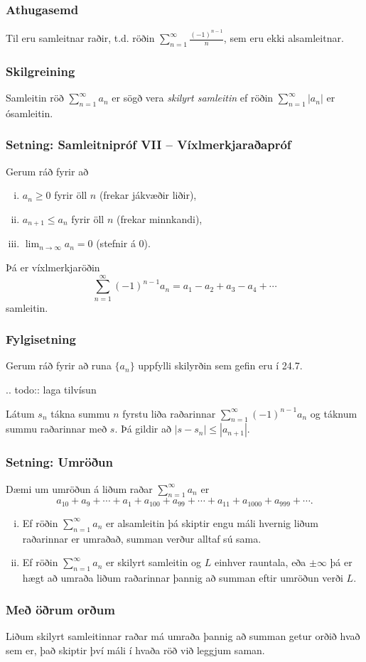 \documentclass[icelandic,a4paper,12pt]{article}
\begin{document}
\subsubsection{Athugasemd}
Til eru samleitnar raðir, t.d. röðin  $\sum_{n=1}^\infty \frac{(-1)^{n-1}}{n}$, sem eru ekki
alsamleitnar. 

\subsubsection{Skilgreining}
Samleitin röð $\sum_{n=1}^\infty a_n$ er sögð vera \emph{skilyrt samleitin} 
ef röðin $\sum_{n=1}^\infty |a_n|$ er ósamleitin.

\subsubsection{Setning: Samleitnipróf VII -- Víxlmerkjaraðapróf}
Gerum ráð fyrir að  
\begin{enumerate}[(i)]
\item $a_n\geq 0$ fyrir öll $n$ (frekar jákvæðir liðir),
\item $a_{n+1}\leq a_n$ fyrir öll $n$ (frekar minnkandi),
\item $\lim_{n\rightarrow\infty} a_n=0$ (stefnir á 0).
\end{enumerate}
Þá er víxlmerkjaröðin 
$$\sum_{n=1}^\infty (-1)^{n-1}a_n=a_1-a_2+a_3-a_4+\cdots$$
samleitin.

\subsubsection{Fylgisetning}
Gerum ráð fyrir að runa $\{a_n\}$ uppfylli skilyrðin sem gefin eru í
24.7. 

.. todo::
  laga tilvísun

Látum $s_n$ tákna summu $n$ fyrstu liða raðarinnar $\sum_{n=1}^\infty (-1)^{n-1}a_n$ 
og táknum summu raðarinnar með $s$. Þá gildir að $|s-s_n|\leq |a_{n+1}|$.

\subsubsection{Setning: Umröðun}
Dæmi um umröðun á liðum raðar $\sum_{n=1}^\infty a_n$ er
$$a_{10}+a_9+\cdots+a_1+a_{100}+a_{99}+\cdots+a_{11}+
a_{1000}+a_{999}+\cdots.$$
\begin{enumerate}[(i)]
\item Ef röðin $\sum_{n=1}^\infty a_n$ er alsamleitin þá skiptir
engu máli hvernig liðum raðarinnar er umraðað, summan verður alltaf sú sama.  
\item Ef röðin $\sum_{n=1}^\infty a_n$ er skilyrt samleitin
og $L$ einhver rauntala, eða $\pm\infty$ þá er hægt að
umraða liðum raðarinnar þannig að summan eftir umröðun verði $L$.
\end{enumerate}

\subsubsection{Með öðrum orðum}
Liðum skilyrt samleitinnar raðar má umraða þannig að summan getur orðið hvað sem
er, það skiptir því máli í hvaða röð við leggjum saman.
\end{document}
